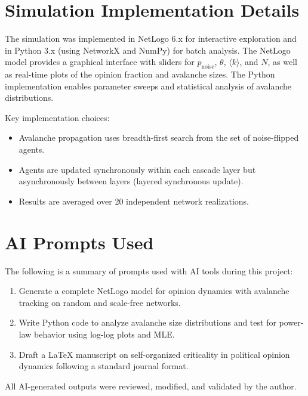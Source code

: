\documentclass[11pt,twocolumn]{article}
\begin{document}
\appendix

\section{Simulation Implementation Details}

The simulation was implemented in NetLogo 6.x for interactive exploration and in Python 3.x (using NetworkX and NumPy) for batch analysis. The NetLogo model provides a graphical interface with sliders for $p_{\text{noise}}$, $\theta$, $\langle k \rangle$, and $N$, as well as real-time plots of the opinion fraction and avalanche sizes. The Python implementation enables parameter sweeps and statistical analysis of avalanche distributions.

Key implementation choices:
\begin{itemize}
\item Avalanche propagation uses breadth-first search from the set of noise-flipped agents.
\item Agents are updated synchronously within each cascade layer but asynchronously between layers (layered synchronous update).
\item Results are averaged over 20 independent network realizations.
\end{itemize}

\section{AI Prompts Used}

The following is a summary of prompts used with AI tools during this project:

\begin{enumerate}
\item Generate a complete NetLogo model for opinion dynamics with avalanche tracking on random and scale-free networks.
\item Write Python code to analyze avalanche size distributions and test for power-law behavior using log-log plots and MLE.
\item Draft a LaTeX manuscript on self-organized criticality in political opinion dynamics following a standard journal format.
\end{enumerate}

All AI-generated outputs were reviewed, modified, and validated by the author.
\end{document}
